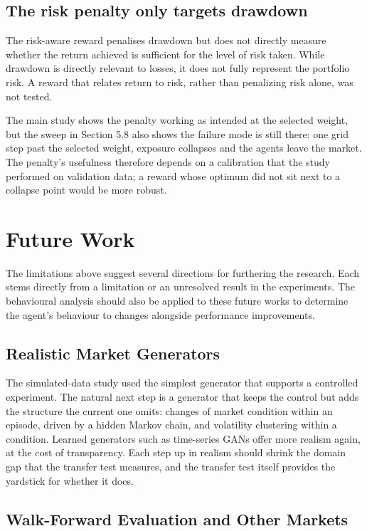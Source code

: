 \subsection{The risk penalty only targets drawdown}

The risk-aware reward penalises drawdown but does not directly measure
whether the return achieved is sufficient for the level of risk taken.
While drawdown is directly relevant to losses, it does not fully
represent the portfolio risk. A reward that relates return to risk,
rather than penalizing risk alone, was not tested.

The main study shows the penalty working as intended at the selected
weight, but the sweep in Section 5.8 also shows the failure mode is
still there: one grid step past the selected weight, exposure collapses
and the agents leave the market. The penalty's usefulness therefore
depends on a calibration that the study performed on validation data; a
reward whose optimum did not sit next to a collapse point would be more
robust.

\section{Future Work}

The limitations above suggest several directions for furthering the
research. Each stems directly from a limitation or an unresolved result
in the experiments. The behavioural analysis should also be applied to
these future works to determine the agent's behaviour to changes
alongside performance improvements.

\subsection{Realistic Market Generators}

The simulated-data study used the simplest generator that supports a
controlled experiment. The natural next step is a generator that keeps
the control but adds the structure the current one omits: changes of
market condition within an episode, driven by a hidden Markov chain, and
volatility clustering within a condition. Learned generators such as
time-series GANs offer more realism again, at the cost of transparency.
Each step up in realism should shrink the domain gap that the transfer
test measures, and the transfer test itself provides the yardstick for
whether it does.

\subsection{Walk-Forward Evaluation and Other Markets}

